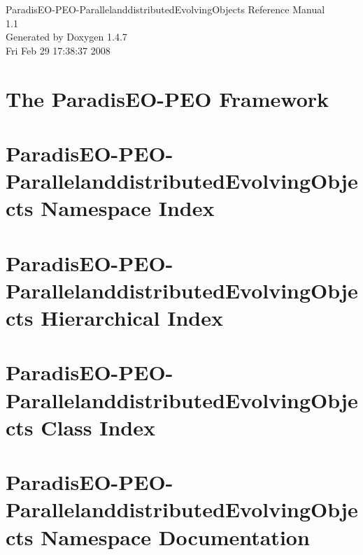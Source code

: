 \documentclass[a4paper]{book}
\begin{document}
\begin{titlepage}
\vspace*{7cm}
\begin{center}
{\Large Paradis\-EO-PEO-Parallelanddistributed\-Evolving\-Objects Reference Manual\\[1ex]\large 1.1 }\\
\vspace*{1cm}
{\large Generated by Doxygen 1.4.7}\\
\vspace*{0.5cm}
{\small Fri Feb 29 17:38:37 2008}\\
\end{center}
\end{titlepage}
\clearemptydoublepage
{}
\tableofcontents
\clearemptydoublepage
{}
\chapter{The Paradis\-EO-PEO Framework }
\label{index}\hypertarget{index}{}
\chapter{Paradis\-EO-PEO-Parallelanddistributed\-Evolving\-Objects Namespace Index}

\chapter{Paradis\-EO-PEO-Parallelanddistributed\-Evolving\-Objects Hierarchical Index}

\chapter{Paradis\-EO-PEO-Parallelanddistributed\-Evolving\-Objects Class Index}

\chapter{Paradis\-EO-PEO-Parallelanddistributed\-Evolving\-Objects Namespace Documentation}

\end{document}
